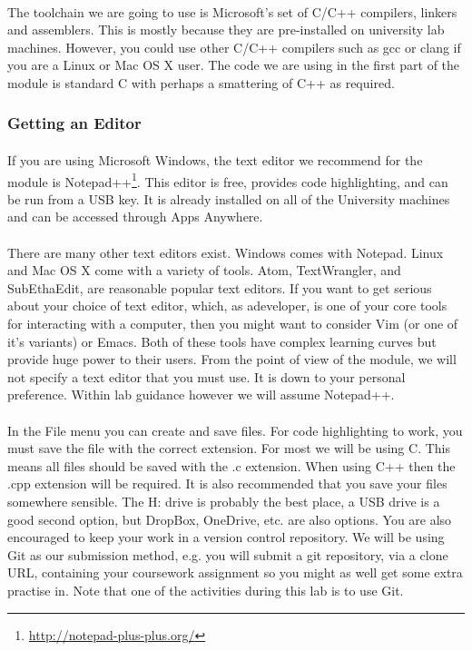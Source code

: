 \documentclass[10pt, a4paper, twosize]{article}
\begin{document}
\paragraph{} The toolchain we are going to use is Microsoft’s set of C/C++ compilers, linkers and assemblers. This is mostly because they are pre-installed on university lab machines. However, you could use other C/C++ compilers such as gcc or clang if you are a Linux or Mac OS X user. The code we are using in the first part of the module is standard C with perhaps a smattering of C++ as required.

\subsubsection{Getting an Editor}
\paragraph{} If you are using Microsoft Windows, the text editor we recommend for the module is Notepad++\footnote{\url{http://notepad-plus-plus.org/}}. This editor is free, provides code highlighting, and can be run from a USB key. It is already installed on all of the University machines and can be accessed through Apps Anywhere.

\paragraph{} There are many other text editors exist. Windows comes with Notepad. Linux and Mac OS X come with a variety of tools. Atom, TextWrangler, and SubEthaEdit, are reasonable popular text editors. If you want to get serious about your choice of text editor, which, as adeveloper, is one of your core tools for interacting with a computer, then you might want to consider Vim (or one of it's variants) or Emacs. Both of these tools have complex learning curves but provide huge power to their users. From the point of view of the module, we will not specify a text editor that you must use. It is down to your personal preference. Within lab guidance however we will assume Notepad++.


\paragraph{} In the File menu you can create and save files. For code highlighting to work, you must save the file with the correct extension. For most we will be using C. This means all files should be saved with the .c extension. When using C++ then the .cpp extension will be required. It is also recommended that you save your files somewhere sensible. The H: drive is probably the best place, a USB drive is a good second option, but DropBox, OneDrive, etc. are also options. You are also encouraged to keep your work in a version control repository. We will be using Git as our submission method, e.g. you will submit a git repository, via a clone URL, containing your coursework assignment so you might as well get some extra practise in. Note that one of the activities during this lab is to use Git.
\end{document}
